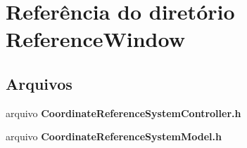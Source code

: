 \section{Referência do diretório Reference\+Window}
\label{dir_2b3505593e71fb8ac2db09eea59f288d}
\subsection*{Arquivos}
\begin{DoxyCompactItemize}
\item 
arquivo {\bf Coordinate\+Reference\+System\+Controller.\+h}
\item 
arquivo {\bf Coordinate\+Reference\+System\+Model.\+h}
\end{DoxyCompactItemize}
